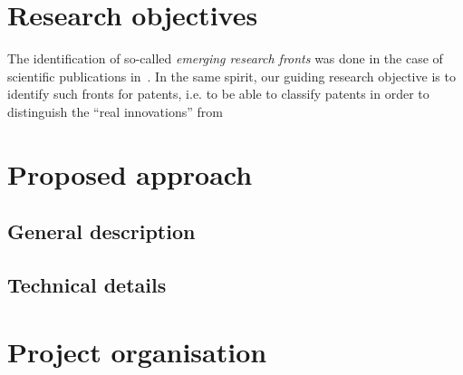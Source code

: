 \section{Research objectives}

The identification of so-called \emph{emerging research fronts} was done in the case of scientific publications in~\cite{shibata2008detecting}. In the same spirit, our guiding research objective is to identify such fronts for patents, i.e. to be able to classify patents in order to distinguish the ``real innovations'' from 



\section{Proposed approach}

\subsection{General description}




\subsection{Technical details}






\section{Project organisation}





















